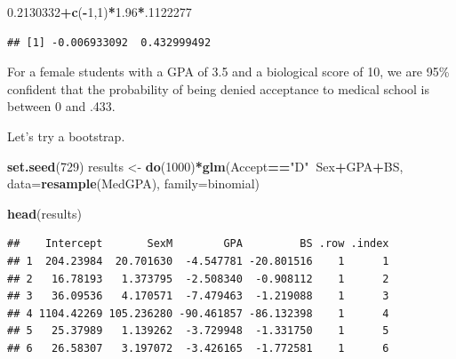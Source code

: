 \documentclass[
]{book}
\newenvironment{Shaded}{\begin{snugshade}}{\end{snugshade}}
\newcommand{\DataTypeTok}[1]{\textcolor[rgb]{0.13,0.29,0.53}{#1}}
\newcommand{\DecValTok}[1]{\textcolor[rgb]{0.00,0.00,0.81}{#1}}
\newcommand{\FloatTok}[1]{\textcolor[rgb]{0.00,0.00,0.81}{#1}}
\newcommand{\KeywordTok}[1]{\textcolor[rgb]{0.13,0.29,0.53}{\textbf{#1}}}
\newcommand{\NormalTok}[1]{#1}
\newcommand{\OperatorTok}[1]{\textcolor[rgb]{0.81,0.36,0.00}{\textbf{#1}}}
\newcommand{\StringTok}[1]{\textcolor[rgb]{0.31,0.60,0.02}{#1}}
\begin{document}
\begin{Shaded}
\begin{Highlighting}[]
\FloatTok{0.2130332}\OperatorTok{+}\KeywordTok{c}\NormalTok{(}\OperatorTok{-}\DecValTok{1}\NormalTok{,}\DecValTok{1}\NormalTok{)}\OperatorTok{*}\FloatTok{1.96}\OperatorTok{*}\NormalTok{.}\DecValTok{1122277}
\end{Highlighting}
\end{Shaded}

\begin{verbatim}
## [1] -0.006933092  0.432999492
\end{verbatim}

For a female students with a GPA of 3.5 and a biological score of 10, we are 95\% confident that the probability of being denied acceptance to medical school is between 0 and .433.

Let's try a bootstrap.

\begin{Shaded}
\begin{Highlighting}[]
\KeywordTok{set.seed}\NormalTok{(}\DecValTok{729}\NormalTok{)}
\NormalTok{results <-}\StringTok{ }\KeywordTok{do}\NormalTok{(}\DecValTok{1000}\NormalTok{)}\OperatorTok{*}\KeywordTok{glm}\NormalTok{(Accept}\OperatorTok{==}\StringTok{"D"}\OperatorTok{~}\NormalTok{Sex}\OperatorTok{+}\NormalTok{GPA}\OperatorTok{+}\NormalTok{BS,}
                      \DataTypeTok{data=}\KeywordTok{resample}\NormalTok{(MedGPA),}
                      \DataTypeTok{family=}\NormalTok{binomial)}
\end{Highlighting}
\end{Shaded}

\begin{Shaded}
\begin{Highlighting}[]
\KeywordTok{head}\NormalTok{(results)}
\end{Highlighting}
\end{Shaded}

\begin{verbatim}
##    Intercept       SexM        GPA         BS .row .index
## 1  204.23984  20.701630  -4.547781 -20.801516    1      1
## 2   16.78193   1.373795  -2.508340  -0.908112    1      2
## 3   36.09536   4.170571  -7.479463  -1.219088    1      3
## 4 1104.42269 105.236280 -90.461857 -86.132398    1      4
## 5   25.37989   1.139262  -3.729948  -1.331750    1      5
## 6   26.58307   3.197072  -3.426165  -1.772581    1      6
\end{verbatim}

\begin{Shaded}
\end{Shaded}
\end{document}
